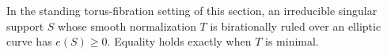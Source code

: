 \begin{proposition}[P4.22]\hypertarget{tag-02WU}{}\label{night:P4.22}\label{stmt:P4.22}


In the standing torus-fibration setting of this section, an irreducible singular support
$S$ whose smooth normalization $T$ is birationally ruled
over an elliptic curve has $e(S)\ge0$. Equality holds
exactly when $T$ is minimal.
\end{proposition}
